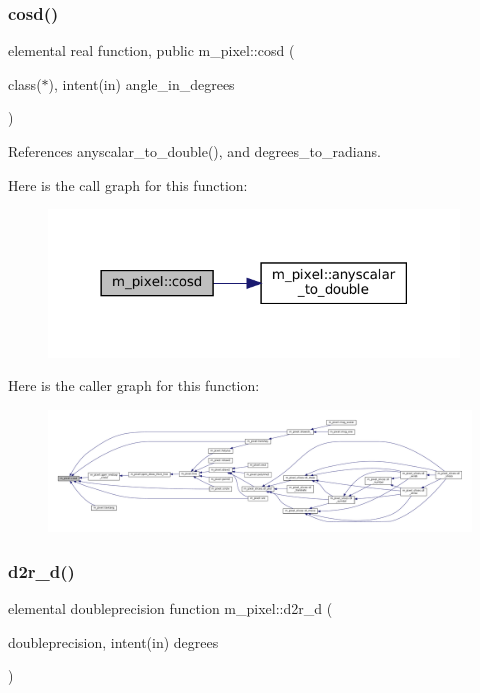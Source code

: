 \subsubsection{\texorpdfstring{cosd()}{cosd()}}
{\footnotesize\ttfamily elemental real function, public m\+\_\+pixel\+::cosd (\begin{DoxyParamCaption}\item[{class($\ast$), intent(in)}]{angle\+\_\+in\+\_\+degrees }\end{DoxyParamCaption})}



References anyscalar\+\_\+to\+\_\+double(), and degrees\+\_\+to\+\_\+radians.

Here is the call graph for this function\+:
\nopagebreak
\begin{figure}[H]
\begin{center}
\leavevmode
\includegraphics[width=309pt]{namespacem__pixel_a312c40bfbd03b2bbe6f85bc5efca6ce3_cgraph}
\end{center}
\end{figure}
Here is the caller graph for this function\+:
\nopagebreak
\begin{figure}[H]
\begin{center}
\leavevmode
\includegraphics[width=350pt]{namespacem__pixel_a312c40bfbd03b2bbe6f85bc5efca6ce3_icgraph}
\end{center}
\end{figure}
\mbox{\label{namespacem__pixel_a2ea42e55432274dec04fdc822e484cdb}} 
\subsubsection{\texorpdfstring{d2r\+\_\+d()}{d2r\_d()}}
{\footnotesize\ttfamily elemental doubleprecision function m\+\_\+pixel\+::d2r\+\_\+d (\begin{DoxyParamCaption}\item[{doubleprecision, intent(in)}]{degrees }\end{DoxyParamCaption})\hspace{0.3cm}{\ttfamily [private]}}

